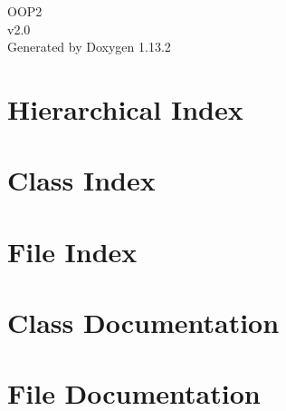 \documentclass[twoside]{book}
\newcommand{\+}{\discretionary{\mbox{\scriptsize$\hookleftarrow$}}{}{}}
\newcommand{\clearemptydoublepage}{%
    \newpage{\pagestyle{empty}\cleardoublepage}%
  }
\begin{document}
  \raggedbottom
    \hypersetup{pageanchor=false,
                bookmarksnumbered=true,
                pdfencoding=unicode
               }
  \begin{titlepage}
  \vspace*{7cm}
  \begin{center}%
  {\Large OOP2}\\
  [1ex]\large v2.\+0 \\
  \vspace*{1cm}
  {\large Generated by Doxygen 1.13.2}\\
  \end{center}
  \end{titlepage}
  \clearemptydoublepage
  \tableofcontents
  \clearemptydoublepage
  \hypersetup{pageanchor=true}
\chapter{Hierarchical Index}

\chapter{Class Index}

\chapter{File Index}

\chapter{Class Documentation}


\chapter{File Documentation}














  \backmatter
  \newpage
  \clearemptydoublepage
  \printindex
\end{document}
